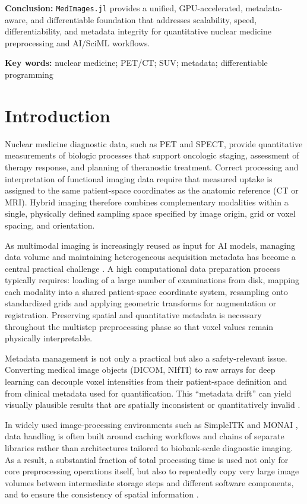 \documentclass[a4paper,10pt]{elsarticle}
\begin{document}
\textbf{Conclusion:} \texttt{MedImages.jl} provides a unified, GPU-accelerated, metadata-aware, and differentiable foundation that addresses scalability, speed, differentiability, and metadata integrity for quantitative nuclear medicine preprocessing and AI/SciML workflows.

\textbf{Key words:} nuclear medicine; PET/CT; SUV; metadata; differentiable programming

\section{Introduction}

Nuclear medicine diagnostic data, such as PET and SPECT, provide quantitative measurements of biologic processes that support oncologic staging, assessment of therapy response, and planning of theranostic treatment. Correct processing and interpretation of functional imaging data require that measured uptake is assigned to the same patient-space coordinates as the anatomic reference (CT or MRI). Hybrid imaging therefore combines complementary modalities within a single, physically defined sampling space specified by image origin, grid or voxel spacing, and orientation. 
 
As multimodal imaging is increasingly reused as input for AI models, managing data volume and maintaining heterogeneous acquisition metadata has become a central practical challenge \cite{}. A high computational data preparation process typically requires: loading of a large number of examinations from disk, mapping each modality into a shared patient-space coordinate system, resampling onto standardized grids and applying geometric transforms for augmentation or registration. Preserving spatial and quantitative metadata is necessary throughout the multistep preprocessing phase so that voxel values remain physically interpretable. 

Metadata management is not only a practical but also a safety-relevant issue. Converting medical image objects (DICOM, NIfTI) to raw arrays for deep learning can decouple voxel intensities from their patient-space definition and from clinical metadata used for quantification. This ``metadata drift'' can yield visually plausible results that are spatially inconsistent or quantitatively invalid \cite{}.

In widely used image-processing environments such as SimpleITK \cite{LowekampChen2013} and MONAI \cite{CardosoLi2022}, data handling is often built around caching workflows and chains of separate libraries rather than architectures tailored to biobank-scale diagnostic imaging. As a result, a substantial fraction of total processing time is used not only for core preprocessing operations itself, but also to repeatedly copy very large image volumes between intermediate storage steps and different software components, and to ensure the consistency of spatial information \cite{Dexl_2025}.
\end{document}
